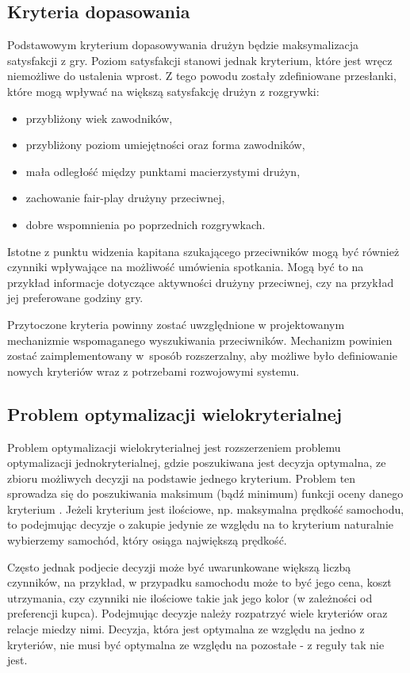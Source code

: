 \subsection{Kryteria dopasowania}

Podstawowym kryterium dopasowywania drużyn będzie maksymalizacja satysfakcji z gry. Poziom satysfakcji stanowi jednak kryterium, które jest wręcz niemożliwe do ustalenia wprost. Z tego powodu zostały zdefiniowane przesłanki, które mogą wpływać na większą satysfakcję drużyn z rozgrywki:

\begin{itemize}
\item{przybliżony wiek zawodników,}
\item{przybliżony poziom umiejętności oraz forma zawodników,}
\item{mała odległość między punktami macierzystymi drużyn,}
\item{zachowanie fair-play drużyny przeciwnej,}
\item{dobre wspomnienia po poprzednich rozgrywkach.}
\end{itemize}

Istotne z punktu widzenia kapitana szukającego przeciwników mogą być również czynniki wpływające na możliwość umówienia spotkania. Mogą być to na przykład informacje dotyczące aktywności drużyny przeciwnej, czy na przykład jej preferowane godziny gry.

Przytoczone kryteria powinny zostać uwzględnione w projektowanym mechanizmie wspomaganego wyszukiwania przeciwników. Mechanizm powinien zostać zaimplementowany w~sposób rozszerzalny, aby możliwe było definiowanie nowych kryteriów wraz z potrzebami rozwojowymi systemu.

\subsection{Problem optymalizacji wielokryterialnej}

Problem optymalizacji wielokryterialnej jest rozszerzeniem problemu optymalizacji jednokryterialnej, gdzie poszukiwana jest decyzja optymalna, ze zbioru możliwych decyzji na podstawie jednego kryterium. Problem ten sprowadza się do poszukiwania maksimum (bądź minimum) funkcji oceny danego kryterium \cite{optwielok}. Jeżeli kryterium jest ilościowe, np. maksymalna prędkość samochodu, to podejmując decyzje o zakupie jedynie ze względu na to kryterium naturalnie wybierzemy samochód, który osiąga największą prędkość. 

Często jednak podjecie decyzji może być uwarunkowane większą liczbą czynników, na przykład, w przypadku samochodu może to być jego cena, koszt utrzymania, czy czynniki nie ilościowe takie jak jego kolor (w zależności od preferencji kupca). Podejmując decyzje należy rozpatrzyć wiele kryteriów oraz relacje miedzy nimi. Decyzja, która jest optymalna ze względu na jedno z kryteriów, nie musi być optymalna ze względu na pozostałe - z reguły tak nie jest.


